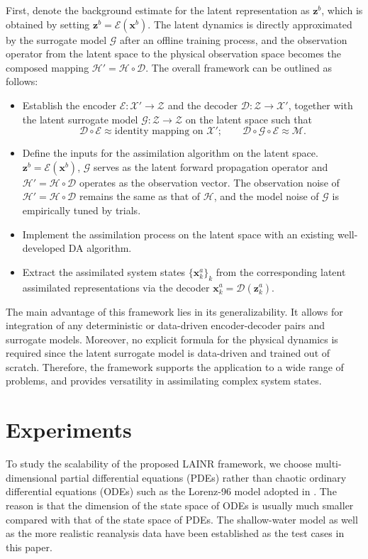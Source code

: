 \documentclass{article}
\newcommand{\mM}{\mathcal{M}}
\newcommand{\mH}{\mathcal{H}}
\newcommand{\mX}{\mathcal{X}}
\newcommand{\mZ}{\mathcal{Z}}
\newcommand{\mE}{\mathcal{E}}
\newcommand{\mD}{\mathcal{D}}
\newcommand{\mG}{\mathcal{G}}
\begin{document}
First, denote the background estimate for the latent representation as $\bm z^b$, which is obtained by setting $\bm z^b=\mE(\bm x^b)$. The latent dynamics is directly approximated by the surrogate model $\mG$ after an offline training process, and the observation operator from the latent space to the physical observation space becomes the composed mapping $\mH'=\mH\circ\mD$. The overall framework can be outlined as follows:
\begin{itemize}
	\item Establish the encoder $\mE:\mX'\to\mZ$ and the decoder $\mD:\mZ\to\mX'$, together with the latent surrogate model $\mG:\mZ\to\mZ$ on the latent space such that
	      \[\mD\circ\mE\approx\textrm{identity mapping on }\mX';\qquad\mD\circ\mG\circ\mE\approx\mM.\]
	\item Define the inputs for the assimilation algorithm on the latent space. $\bm z^b=\mE(\bm x^b)$, $\mG$ serves as the latent forward propagation operator and $\mH'=\mH\circ\mD$ operates as the observation vector. The observation noise of $\mH'=\mH\circ\mD$ remains the same as that of $\mH$, and the model noise of $\mG$ is empirically tuned by trials.
	\item Implement the assimilation process on the latent space with an existing well-developed DA algorithm.
	\item Extract the assimilated system states $\{\bm x_k^a\}_k$ from the corresponding latent assimilated representations via the decoder $\bm x_k^a=\mD(\bm z_k^a)$.
\end{itemize}
The main advantage of this framework lies in its generalizability. It allows for integration of any deterministic or data-driven encoder-decoder pairs and surrogate models. Moreover, no explicit formula for the physical dynamics is required since the latent surrogate model is data-driven and trained out of scratch. Therefore, the framework supports the application to a wide range of problems, and provides versatility in assimilating complex system states.
\section{Experiments}
To study the scalability of the proposed LAINR framework, we choose multi-dimensional partial differential equations (PDEs) rather than chaotic ordinary differential equations (ODEs) such as the Lorenz-96 model adopted in \cite{Peyron2021LAwithAE,LatentspaceDA-RNN}. The reason is that the dimension of the state space of ODEs is usually much smaller compared with that of the state space of PDEs. The shallow-water model as well as the more realistic reanalysis data have been established as the test cases in this paper.
\end{document}
